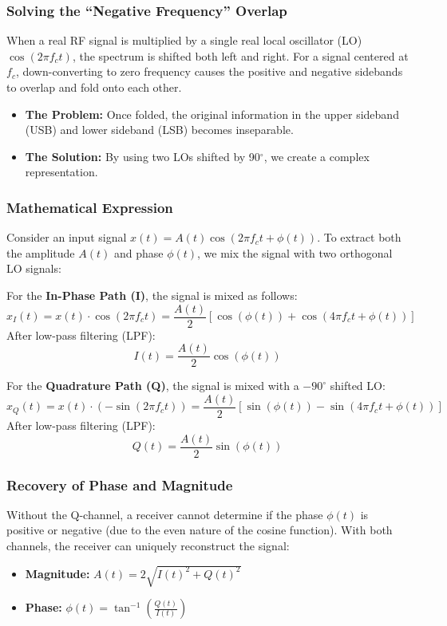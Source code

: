 \documentclass[conference]{IEEEtran}
\begin{document}
\subsubsection{Solving the ``Negative Frequency'' Overlap}
When a real RF signal is multiplied by a single real local oscillator (LO) $\cos(2\pi f_c t)$, the spectrum is shifted both left and right. For a signal centered at $f_c$, down-converting to zero frequency causes the positive and negative sidebands to overlap and fold onto each other. 
\begin{itemize}
    \item \textbf{The Problem:} Once folded, the original information in the upper sideband (USB) and lower sideband (LSB) becomes inseparable.
    \item \textbf{The Solution:} By using two LOs shifted by 90$^\circ$, we create a complex representation. 
\end{itemize}

\subsubsection{Mathematical Expression}
Consider an input signal $x(t) = A(t)\cos(2\pi f_c t + \phi(t))$. 
To extract both the amplitude $A(t)$ and phase $\phi(t)$, we mix the signal with two orthogonal LO signals:

For the \textbf{In-Phase Path (I)}, the signal is mixed as follows:
\begin{equation}
x_I(t) = x(t) \cdot \cos(2\pi f_c t) = \frac{A(t)}{2}[\cos(\phi(t)) + \cos(4\pi f_c t + \phi(t))]
\end{equation}
After low-pass filtering (LPF):
\begin{equation}
I(t) = \frac{A(t)}{2}\cos(\phi(t))
\end{equation}

For the \textbf{Quadrature Path (Q)}, the signal is mixed with a $-90^\circ$ shifted LO:
\begin{equation}
x_Q(t) = x(t) \cdot (-\sin(2\pi f_c t)) = \frac{A(t)}{2}[\sin(\phi(t)) - \sin(4\pi f_c t + \phi(t))]
\end{equation}
After low-pass filtering (LPF):
\begin{equation}
Q(t) = \frac{A(t)}{2}\sin(\phi(t))
\end{equation}

\subsubsection{Recovery of Phase and Magnitude}
Without the Q-channel, a receiver cannot determine if the phase $\phi(t)$ is positive or negative (due to the even nature of the cosine function). With both channels, the receiver can uniquely reconstruct the signal:
\begin{itemize}
    \item \textbf{Magnitude:} $A(t) = 2\sqrt{I(t)^2 + Q(t)^2}$
    \item \textbf{Phase:} $\phi(t) = \tan^{-1}\left(\frac{Q(t)}{I(t)}\right)$
\end{itemize}
\end{document}
